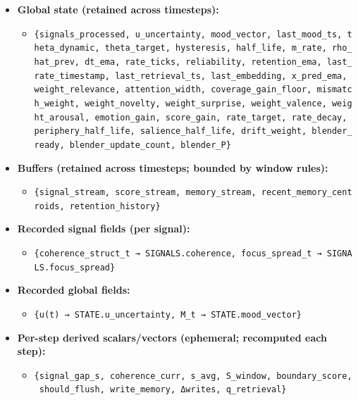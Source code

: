 \documentclass[
  letterpaper,
  DIV=11,
  numbers=noendperiod]{scrartcl}
\providecommand{\tightlist}{%
  \setlength{\itemsep}{0pt}\setlength{\parskip}{0pt}}
\begin{document}
\begin{itemize}
  \begin{itemize}
  \tightlist
  \item
    \texttt{\{μ\_acc,\ drift\_acc,\ s\_sum,\ s\_max,\ n,\ e\_peak,\ emo\_max,\ arousal\_sum,\ eta\_acc,\ coherence\_prev,\ acc\_signals\_window,\ t\_start,\ last\_signal\_ts,\ last\_write\_ts,\ drift\_accum,\ drift\_at\_last\_interrupt,\ drift\_acc\_pacing,\ x\_last\_check,\ prev\_x\}}
  \end{itemize}
\item
  \textbf{Global state (retained across timesteps):}

  \begin{itemize}
  \tightlist
  \item
    \texttt{\{signals\_processed,\ u\_uncertainty,\ mood\_vector,\ last\_mood\_ts,\ theta\_dynamic,\ theta\_target,\ hysteresis,\ half\_life,\ m\_rate,\ rho\_hat\_prev,\ dt\_ema,\ rate\_ticks,\ reliability,\ retention\_ema,\ last\_rate\_timestamp,\ last\_retrieval\_ts,\ last\_embedding,\ x\_pred\_ema,\ weight\_relevance,\ attention\_width,\ coverage\_gain\_floor,\ mismatch\_weight,\ weight\_novelty,\ weight\_surprise,\ weight\_valence,\ weight\_arousal,\ emotion\_gain,\ score\_gain,\ rate\_target,\ rate\_decay,\ periphery\_half\_life,\ salience\_half\_life,\ drift\_weight,\ blender\_ready,\ blender\_update\_count,\ blender\_P\}}
  \end{itemize}
\item
  \textbf{Buffers (retained across timesteps; bounded by window rules):}

  \begin{itemize}
  \tightlist
  \item
    \texttt{\{signal\_stream,\ score\_stream,\ memory\_stream,\ recent\_memory\_centroids,\ retention\_history\}}
  \end{itemize}
\item
  \textbf{Recorded signal fields (per signal):}

  \begin{itemize}
  \tightlist
  \item
    \texttt{\{coherence\_struct\_t\ →\ SIGNALS.coherence,\ focus\_spread\_t\ →\ SIGNALS.focus\_spread\}}
  \end{itemize}
\item
  \textbf{Recorded global fields:}

  \begin{itemize}
  \tightlist
  \item
    \texttt{\{u(t)\ →\ STATE.u\_uncertainty,\ M\_t\ →\ STATE.mood\_vector\}}
  \end{itemize}
\item
  \textbf{Per-step derived scalars/vectors (ephemeral; recomputed each
  step):}

  \begin{itemize}
  \tightlist
  \item
    \texttt{\{signal\_gap\_s,\ coherence\_curr,\ s\_avg,\ S\_window,\ boundary\_score,\ should\_flush,\ write\_memory,\ Δwrites,\ q\_retrieval\}}
  \end{itemize}
\end{itemize}
\end{document}
